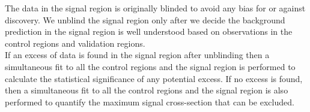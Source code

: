 \indent The data in the signal region is originally blinded to avoid any bias for or against discovery.  We unblind the signal region only after we decide the background prediction in the signal region is well understood based on observations in the control regions and validation regions. \\

\indent If an excess of data is found in the signal region after unblinding then a simultaneous fit to all the control regions and the signal region is performed to calculate the statistical significance of any potential excess.   If no excess is found, then a simultaneous fit to all the control regions and the signal region is also performed to quantify the maximum signal cross-section that can be excluded.  \\
